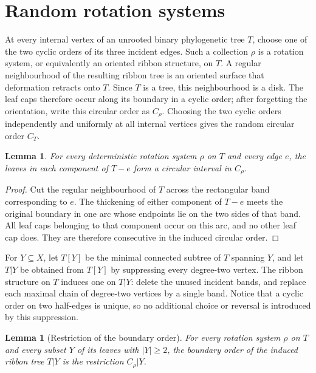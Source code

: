 \documentclass[a4paper]{amsart}
\newtheorem{lemma}[theorem]{Lemma}
\theoremstyle{remark}
\begin{document}
\section{Random rotation systems}

At every internal vertex of an unrooted binary phylogenetic tree
$T$, choose one of the two cyclic orders of its three incident edges.
Such a collection $\rho$ is a rotation system, or equivalently an
oriented ribbon structure, on $T$. A regular neighbourhood of the
resulting ribbon tree is an oriented surface that deformation
retracts onto $T$. Since $T$ is a tree, this neighbourhood is a disk.
The leaf caps therefore occur along its boundary in a cyclic order;
after forgetting the orientation, write this circular order as
$C_\rho$. Choosing the two cyclic orders independently and uniformly
at all internal vertices gives the random circular order $C_T$.

\begin{lemma}\label{lem:edge-interval}
For every deterministic rotation system $\rho$ on $T$ and every edge
$e$, the leaves in each component of $T-e$ form a circular interval
in $C_\rho$.
\end{lemma}

\begin{proof}
Cut the regular neighbourhood of $T$ across the rectangular band
corresponding to $e$. The thickening of either component of $T-e$
meets the original boundary in one arc whose endpoints lie on the two
sides of that band. All leaf caps belonging to that component occur
on this arc, and no other leaf cap does. They are therefore
consecutive in the induced circular order.
\end{proof}

For $Y\subseteq X$, let $T[Y]$ be the minimal connected subtree of
$T$ spanning $Y$, and let $T|Y$ be obtained from $T[Y]$ by
suppressing every degree-two vertex. The ribbon structure on $T$
induces one on $T|Y$: delete the unused incident bands, and replace
each maximal chain of degree-two vertices by a single band. Notice
that a cyclic order on two half-edges is unique, so no additional
choice or reversal is introduced by this suppression.

\begin{lemma}[Restriction of the boundary order]
\label{lem:restriction}
For every rotation system $\rho$ on $T$ and every subset $Y$ of its
leaves with $|Y|\ge2$, the boundary order of the induced ribbon tree
$T|Y$ is the restriction $C_\rho|Y$.
\end{lemma}
\end{document}
